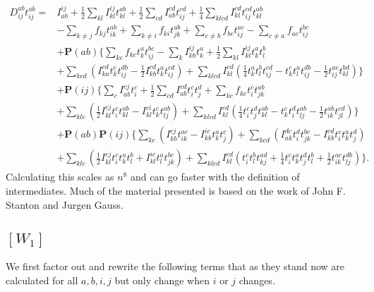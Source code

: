 \begin{align}
D_{ij}^{ab} t_{ij}^{ab} = & 
I_{ab}^{ij}
+ \frac{1}{2} \sum_{kl} I_{kl}^{ij} t_{kl}^{ab} 
+ \frac{1}{2} \sum_{cd} I_{ab}^{cd} t_{ij}^{cd}
+ \frac{1}{4} \sum_{klcd} I_{kl}^{cd}
t_{ij}^{cd} t_{kl}^{ab} 
 \nonumber \\ &
- \sum_{k \not= j} f_{kj} t_{ik}^{ab} 
+ \sum_{k \not= i} f_{ki} t_{jk}^{ab}
+ \sum_{c \not= b} f_{bc} t_{ij}^{ac}
- \sum_{c \not= a} f_{ac} t_{ij}^{bc}
 \nonumber \\ &
+ \textbf{P}(ab) 
\{
\sum_{kc} f_{kc} t_k^a t_{ij}^{bc}
- \sum_k I_{kb}^{ij} t_k^a
+ \frac{1}{2} \sum_{kl} I_{kl}^{ij} t_k^a t_l^b 
\nonumber \\ &
+ \sum_{kcd} 
(
I_{ka}^{cd} t_k^c t_{ij}^{db} 
- \frac{1}{2} I_{kb}^{cd} t_k^a t_{ij}^{cd} 
)
+ \sum_{klcd} I_{kl}^{cd} (\frac{1}{4} t_k^a t_l^b t_{ij}^{cd} - t_k^c t_l^a t_{ij}^{db} - \frac{1}{2} t_{ij}^{ac} t_{kl}^{bd})
\}
\nonumber \\ &
+ \textbf{P}(ij)
\{
\sum_c I_{ab}^{cj} t_i^c
+ \frac{1}{2} \sum_{cd} I_{ab}^{cd} t_i^c t_j^d 
+ \sum_{kc} f_{kc} t_i^c t_{jk}^{ab}
\nonumber \\ &
+ \sum_{klc}
( 
\frac{1}{2} 
I_{kl}^{cj} t_i^c t_{kl}^{ab}
- I_{kl}^{ci} t_k^c t_{lj}^{ab}
)
+ \sum_{klcd} I_{kl}^{cd}
(
\frac{1}{4} t_i^c t_j^d t_{kl}^{ab} 
- t_k^c t_i^d t_{lj}^{ab} 
- \frac{1}{2} t_{ik}^{ab} t_{jl}^{cd}
)
\}
\nonumber \\ &
+ \textbf{P}(ab) \textbf{P}(ij)
\{
\sum_{kc}
(
I_{kb}^{cj} t_{ik}^{ac}
- I_{kb}^{ic} t_k^a t_j^c
)
+ \sum_{kcd}
(
I_{ak}^{dc} t_i^d t_{jk}^{bc}
- I_{kb}^{cd} t_i^c t_k^a t_j^d
)
\nonumber \\ &
+ \sum_{klc}
(
\frac{1}{2} I_{kl}^{cj} t_i^c t_k^a t_l^b
+ I_{kl}^{ic} t_l^a t_{jk}^{bc}
)
+ \sum_{klcd} I_{kl}^{cd}
(
t_i^c t_l^b t_{kj}^{ad}
+ \frac{1}{4} t_i^c t_k^a t_j^d t_l^b
+ \frac{1}{2} t_{ik}^{ac} t_{lj}^{db} 
)
\} . 
\end{align}
Calculating this scales as $n^8$ and can go faster with the definition of intermediates. Much of the material presented is based on the work of John F. Stanton and Jurgen Gauss.

\subsection{$[W_1]$}

We first factor out and rewrite the following terms that as they stand now are calculated for all $a,b,i,j$ but only change when $i$ or $j$ changes.


